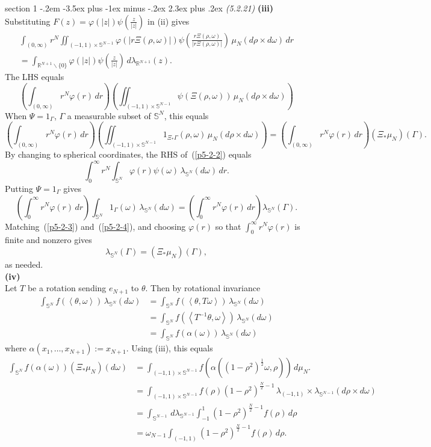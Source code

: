\documentclass[12pt]{article}
\makeatletter
\theoremstyle{norm}
\newcommand{\R}[0]{\mathbb{R}}
\newcommand{\bS}[0]{\mathbb{S}}
\newcommand{\rc}[1]{\frac{1}{#1}}
\newcommand{\al}[0]{\alpha}
\newcommand{\Ga}[0]{\Gamma}
\newcommand{\la}[0]{\lambda}
\newcommand{\ph}[0]{\varphi}
\newcommand{\rh}[0]{\rho}
\newcommand{\te}[0]{\theta}
\newcommand{\om}[0]{\omega}
\newcommand{\pa}[1]{\left( {#1} \right)}
\newcommand{\an}[1]{\left\langle {#1}\right\rangle}
\newcommand{\subprob}[1]{\noindent\textbf{#1}\\}
\newcommand{\pf}[2]{\pa{\frac{#1}{#2}}}
\newcommand{\bs}[0]{\backslash}
\newcommand{\iy}[0]{\infty}
\newenvironment{problem}{\@startsection
       {section}
       {1}
       {-.2em}
       {-3.5ex plus -1ex minus -.2ex}
       {2.3ex plus .2ex}
       {\pagebreak[3]%
       \large\bf\noindent{Problem }
       }
       }
       {%
       }
\makeatother
\begin{document}
\begin{problem}{\it (5.2.21)}
\subprob{(iii)}
Substituting $F(z)=\ph(|z|)\psi\pf{z}{|z|}$ in (ii) gives
\begin{multline}
 \int_{(0,\iy)} r^N\iint_{(-1,1)\times \bS^{N-1}} \ph(|r\Xi(\rh,\om)|) \psi\pf{r\Xi(\rh,\om)}{|r\Xi(\rh,\om)|}\,\mu_N(d\rh\times d\om)\,dr\\
=\int_{\R^{N+1}\bs\{0\}} \ph(|z|)\psi\pf{z}{|z|}\,d\la_{\R^{N+1}}(z).
\label{p5-2-2}
\end{multline}
The LHS equals
\[
\pa{\int_{(0,\iy)} r^N\ph(r)\,dr}\pa{\iint_{(-1,1)\times \bS^{N-1}} \psi\pa{\Xi(\rh,\om)}\,\mu_N(d\rh\times d\om)}%
\]
When $\Psi=1_{\Ga}$, $\Ga$ a measurable subset of $\bS^{N}$, this equals
\begin{equation}
\pa{\int_{(0,\iy)} r^N\ph(r)\,dr}\pa{\iint_{(-1,1)\times \bS^{N-1}} 1_{\Xi_*\Ga}(\rh,\om)\,\mu_N(d\rh\times d\om)}
=\pa{\int_{(0,\iy)} r^N\ph(r)\,dr}(\Xi_*\mu_N)(\Ga).\label{p5-2-3}
\end{equation}
By changing to spherical coordinates, the RHS of~(\ref{p5-2-2}) equals
\[
\int_{0}^{\iy} r^N\int_{\bS^{N}} \ph(r)\psi(\om) \,\la_{\bS^{N}}(d\om)\,dr.
\]
Putting $\Psi=1_{\Ga}$ gives
\begin{equation}
\pa{\int_0^{\iy} r^N\ph(r)\,dr}\int_{\bS^N}1_{\Ga}(\om)\,\la_{\bS^{N}}(d\om)=
\pa{\int_0^{\iy} r^N\ph(r)\,dr}\la_{\bS^{N}}(\Ga).\label{p5-2-4}
\end{equation}
Matching~(\ref{p5-2-3}) and~(\ref{p5-2-4}), and choosing $\ph(r)$ so that $\int_0^{\iy} r^N \ph(r)$ is finite and nonzero gives
\[
\la_{\bS^N}(\Ga)=(\Xi_*\mu_N)(\Ga),
\]
as needed.\\

\subprob{(iv)}
Let $T$ be a rotation sending $e_{N+1}$ to $\te$. Then by rotational invariance
\begin{align*}
\int_{\bS^{N}} f(\an{\te,\om}) \,\la_{\bS^N}(d\om)
&=\int_{\bS^{N}} f(\an{\te,T\om}) \,\la_{\bS^N}(d\om)\\
&=\int_{\bS^{N}} f(\an{T^{-1}\te,\om}) \,\la_{\bS^N}(d\om)\\
&=\int_{\bS^{N}} f(\al(\om)) \,\la_{\bS^N}(d\om)
\end{align*}
where $\al(x_1,\ldots, x_{N+1}):=x_{N+1}$. Using (iii), this equals
\begin{align*}
\int_{\bS^N} f(\al(\om))(\Xi_*\mu_N)(d\om)
&=\int_{(-1,1)\times \bS^{N-1}} f(\al((1-\rh^2)^{\rc 2}\om, \rh))\,d\mu_N.\\
&=\int_{(-1,1)\times \bS^{N-1}} f(\rh)(1-\rh^2)^{\frac N2-1}\,\la_{(-1,1)}\times\la_{\bS^{N-1}}(d\rh\times d\om)\\
&=\int_{\bS^{N-1}}\,d\la_{\bS^{N-1}}\int_{-1}^1 (1-\rh^2)^{\frac N2-1}f(\rh)\,d\rh \\
&=\om_{N-1}\int_{(-1,1)} (1-\rh^2)^{\frac N2-1}f(\rh)\,d\rh.
\end{align*}
\end{problem}
\end{document}

